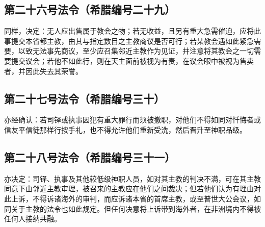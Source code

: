 
\subsection{第二十六号法令（希腊编号二十九）}

\par

同样，决定：无人应出售属于教会之物；若无收益，且另有重大急需催迫，应将此事提交本省都主教，由其与指定数目之主教商议是否可行；若某教会遇如此紧急需要，以致无法事先商议，至少应召集邻近主教作为见证，并注意将其教会之一切需要提交议会；若他不如此行，则在天主面前被视为有责，在议会眼中被视为售卖者，并因此失去其荣誉。\par


\subsection{第二十七号法令（希腊编号三十）}

\par

亦经确认：若司铎或执事因犯有重大罪行而须被撤职，对他们不得如同对忏悔者或信友平信徒那样行按手礼，也不得允许他们重新受洗，然后晋升至神职品级。\par


\subsection{第二十八号法令（希腊编号三十一）}

\par

亦决定：司铎、执事及其他较低级神职人员，如对其主教的判决不满，可在其主教同意下由邻近主教审理，被召来的主教应在他们之间裁决；但若他们认为有理由对此上诉，不得诉诸海外的审判，而应诉诸本省的首席主教，或至普世大公会议，如同关于主教的法令也如此规定。但任何决意将上诉带到海外者，在非洲境内不得被任何人接纳共融。\par


